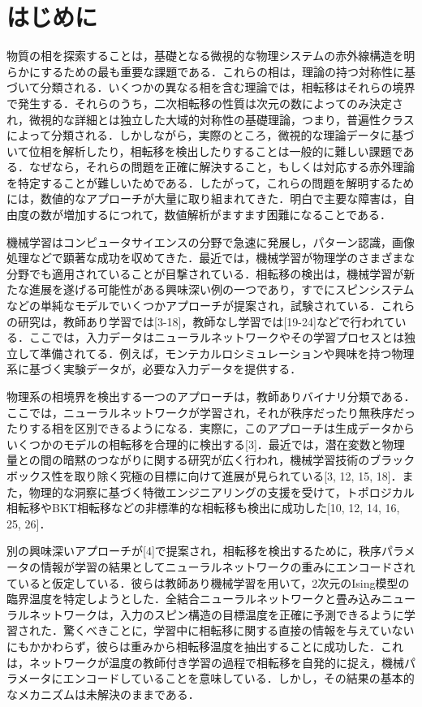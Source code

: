 \documentclass[a4paper,11pt]{jsarticle}
\begin{document}
\section{はじめに}
物質の相を探索することは，基礎となる微視的な物理システムの赤外線構造を明らかにするための最も重要な課題である．これらの相は，理論の持つ対称性に基づいて分類される．いくつかの異なる相を含む理論では，相転移はそれらの境界で発生する．それらのうち，二次相転移の性質は次元の数によってのみ決定され，微視的な詳細とは独立した大域的対称性の基礎理論，つまり，普遍性クラスによって分類される．しかしながら，実際のところ，微視的な理論データに基づいて位相を解析したり，相転移を検出したりすることは一般的に難しい課題である．なぜなら，それらの問題を正確に解決すること，もしくは対応する赤外理論を特定することが難しいためである．したがって，これらの問題を解明するためには，数値的なアプローチが大量に取り組まれてきた．明白で主要な障害は，自由度の数が増加するにつれて，数値解析がますます困難になることである．\par
機械学習はコンピュータサイエンスの分野で急速に発展し，パターン認識，画像処理などで顕著な成功を収めてきた．最近では，機械学習が物理学のさまざまな分野でも適用されていることが目撃されている．相転移の検出は，機械学習が新たな進展を遂げる可能性がある興味深い例の一つであり，すでにスピンシステムなどの単純なモデルでいくつかアプローチが提案され，試験されている．これらの研究は，教師あり学習では[3-18]，教師なし学習では[19-24]などで行われている．ここでは，入力データはニューラルネットワークやその学習プロセスとは独立して準備されてる．例えば，モンテカルロシミュレーションや興味を持つ物理系に基づく実験データが，必要な入力データを提供する．\par
物理系の相境界を検出する一つのアプローチは，教師ありバイナリ分類である．ここでは，ニューラルネットワークが学習され，それが秩序だったり無秩序だったりする相を区別できるようになる．実際に，このアプローチは生成データからいくつかのモデルの相転移を合理的に検出する[3]．最近では，潜在変数と物理量との間の暗黙のつながりに関する研究が広く行われ，機械学習技術のブラックボックス性を取り除く究極の目標に向けて進展が見られている[3, 12, 15, 18]．また，物理的な洞察に基づく特徴エンジニアリングの支援を受けて，トポロジカル相転移やBKT相転移などの非標準的な相転移も検出に成功した[10, 12, 14, 16, 25, 26]．\par
別の興味深いアプローチが[4]で提案され，相転移を検出するために，秩序パラメータの情報が学習の結果としてニューラルネットワークの重みにエンコードされていると仮定している．彼らは教師あり機械学習を用いて，2次元のIsing模型の臨界温度を特定しようとした．全結合ニューラルネットワークと畳み込みニューラルネットワークは，入力のスピン構造の目標温度を正確に予測できるように学習された．驚くべきことに，学習中に相転移に関する直接の情報を与えていないにもかかわらず，彼らは重みから相転移温度を抽出することに成功した．これは，ネットワークが温度の教師付き学習の過程で相転移を自発的に捉え，機械パラメータにエンコードしていることを意味している．しかし，その結果の基本的なメカニズムは未解決のままである．\par
\end{document}
